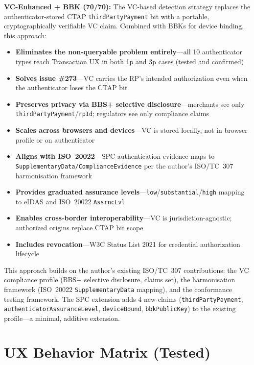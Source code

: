 \documentclass[12pt,a4paper]{article}
\begin{document}
\textbf{VC-Enhanced + BBK (70/70):} The VC-based detection strategy replaces the authenticator-stored CTAP \texttt{thirdPartyPayment} bit with a portable, cryptographically verifiable VC claim. Combined with BBKs for device binding, this approach:
\begin{itemize}[noitemsep,topsep=2pt]
  \item \textbf{Eliminates the non-queryable problem entirely}---all 10 authenticator types reach Transaction UX in both 1p and 3p cases (tested and confirmed)
  \item \textbf{Solves issue \#273}---VC carries the RP's intended authorization even when the authenticator loses the CTAP bit
  \item \textbf{Preserves privacy via BBS+ selective disclosure}---merchants see only \texttt{thirdPartyPayment}/\texttt{rpId}; regulators see only compliance claims
  \item \textbf{Scales across browsers and devices}---VC is stored locally, not in browser profile or on authenticator
  \item \textbf{Aligns with ISO~20022}---SPC authentication evidence maps to \texttt{SupplementaryData/ComplianceEvidence} per the author's ISO/TC~307 harmonisation framework
  \item \textbf{Provides graduated assurance levels}---\texttt{low}/\texttt{substantial}/\texttt{high} mapping to eIDAS and ISO~20022 \texttt{AssrncLvl}
  \item \textbf{Enables cross-border interoperability}---VC is jurisdiction-agnostic; authorized origins replace CTAP bit scope
  \item \textbf{Includes revocation}---W3C Status List 2021 for credential authorization lifecycle
\end{itemize}
This approach builds on the author's existing ISO/TC~307 contributions: the VC compliance profile (BBS+ selective disclosure, claims set), the harmonisation framework (ISO~20022 \texttt{SupplementaryData} mapping), and the conformance testing framework. The SPC extension adds 4 new claims (\texttt{thirdPartyPayment}, \texttt{authenticatorAssuranceLevel}, \texttt{deviceBound}, \texttt{bbkPublicKey}) to the existing profile---a minimal, additive extension.

\newpage
\section{UX Behavior Matrix (Tested)}
\end{document}

